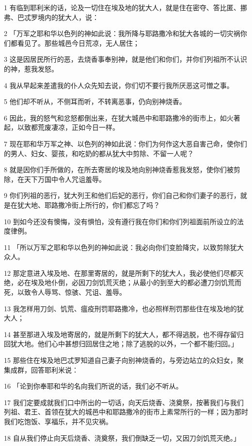 \par 1 有临到耶利米的话，论及一切住在埃及地的犹大人，就是住在密夺、答比匿、挪弗、巴忒罗境内的犹大人，说：
\par 2 「万军之耶和华以色列的神如此说：我所降与耶路撒冷和犹大各城的一切灾祸你们都看见了。那些城邑今日荒凉，无人居住；
\par 3 这是因居民所行的恶，去烧香事奉别神，就是他们和你们，并你们列祖所不认识的神，惹我发怒。
\par 4 我从早起来差遣我的仆人众先知去说，你们切不要行我所厌恶这可憎之事。
\par 5 他们却不听从，不侧耳而听，不转离恶事，仍向别神烧香。
\par 6 因此，我的怒气和忿怒都倒出来，在犹大城邑中和耶路撒冷的街市上，如火著起，以致都荒废凄凉，正如今日一样。
\par 7 现在耶和华万军之神、以色列的神如此说：你们为何作这大恶自害己命，使你们的男人、妇女、婴孩，和吃奶的都从犹大中剪除、不留一人呢？
\par 8 就是因你们手所做的，在所去寄居的埃及地向别神烧香惹我发怒，使你们被剪除，在天下万国中令人咒诅羞辱。
\par 9 你们列祖的恶行，犹大列王和他们后妃的恶行，你们自己和你们妻子的恶行，就是在犹大地、耶路撒冷街上所行的，你们都忘了吗？
\par 10 到如今还没有懊悔，没有惧怕，没有遵行我在你们和你们列祖面前所设立的法度律例。
\par 11 「所以万军之耶和华以色列的神如此说：我必向你们变脸降灾，以致剪除犹大众人。
\par 12 那定意进入埃及地、在那里寄居的，就是所剩下的犹大人，我必使他们尽都灭绝，必在埃及地仆倒，必因刀剑饥荒灭绝；从最小的到至大的都必遭刀剑饥荒而死，以致令人辱骂、惊骇、咒诅、羞辱。
\par 13 我怎样用刀剑、饥荒、瘟疫刑罚耶路撒冷，也必照样刑罚那些住在埃及地的犹大人；
\par 14 甚至那进入埃及地寄居的，就是所剩下的犹大人，都不得逃脱，也不得存留归回犹大地。他们心中甚想归回居住之地；除了逃脱的以外，一个都不能归回。」
\par 15 那些住在埃及地巴忒罗知道自己妻子向别神烧香的，与旁边站立的众妇女，聚集成群，回答耶利米说：
\par 16 「论到你奉耶和华的名向我们所说的话，我们必不听从。
\par 17 我们定要成就我们口中所出的一切话，向天后烧香、浇奠祭，按著我们与我们列祖、君王、首领在犹大的城邑中和耶路撒冷的街市上素常所行的一样；因为那时我们吃饱饭、享福乐，并不见灾祸。
\par 18 自从我们停止向天后烧香、浇奠祭，我们倒缺乏一切，又因刀剑饥荒灭绝。」
